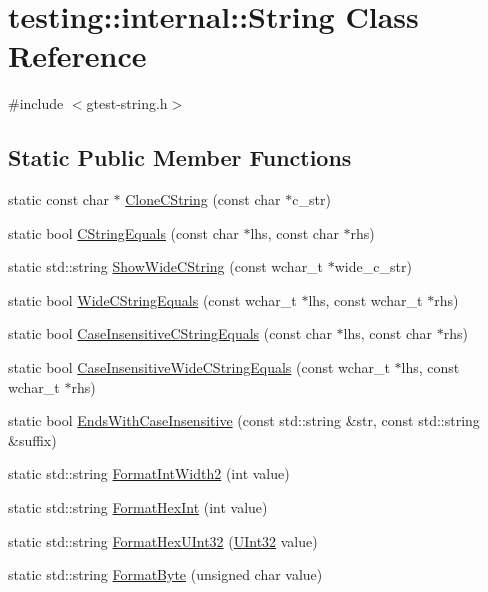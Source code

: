 \hypertarget{classtesting_1_1internal_1_1String}{}\section{testing\+:\+:internal\+:\+:String Class Reference}
\label{classtesting_1_1internal_1_1String}


{\ttfamily \#include $<$gtest-\/string.\+h$>$}

\subsection*{Static Public Member Functions}
\begin{DoxyCompactItemize}
\item 
static const char $\ast$ \hyperlink{classtesting_1_1internal_1_1String_a8bce6b1281ae3d2f9061b920aa78aca0}{Clone\+C\+String} (const char $\ast$c\+\_\+str)
\item 
static bool \hyperlink{classtesting_1_1internal_1_1String_a06919f642bd47f0593196b460d352f24}{C\+String\+Equals} (const char $\ast$lhs, const char $\ast$rhs)
\item 
static std\+::string \hyperlink{classtesting_1_1internal_1_1String_acbf0511e9ae5009f42de77e565f6ba61}{Show\+Wide\+C\+String} (const wchar\+\_\+t $\ast$wide\+\_\+c\+\_\+str)
\item 
static bool \hyperlink{classtesting_1_1internal_1_1String_a4f5e053907ebced07fe0dc52dd2d1e85}{Wide\+C\+String\+Equals} (const wchar\+\_\+t $\ast$lhs, const wchar\+\_\+t $\ast$rhs)
\item 
static bool \hyperlink{classtesting_1_1internal_1_1String_a7ce24c41c67b928fe89434d3571c988c}{Case\+Insensitive\+C\+String\+Equals} (const char $\ast$lhs, const char $\ast$rhs)
\item 
static bool \hyperlink{classtesting_1_1internal_1_1String_a0a67eac434fa7800640c9d56cb91e105}{Case\+Insensitive\+Wide\+C\+String\+Equals} (const wchar\+\_\+t $\ast$lhs, const wchar\+\_\+t $\ast$rhs)
\item 
static bool \hyperlink{classtesting_1_1internal_1_1String_a3de1df085eddc89ef3f3833c67aee3fe}{Ends\+With\+Case\+Insensitive} (const std\+::string \&str, const std\+::string \&suffix)
\item 
static std\+::string \hyperlink{classtesting_1_1internal_1_1String_a51cab855f7ec6091e5886b6be5598ca2}{Format\+Int\+Width2} (int value)
\item 
static std\+::string \hyperlink{classtesting_1_1internal_1_1String_a7bedf4780e0c938d203b73ddb17ff490}{Format\+Hex\+Int} (int value)
\item 
static std\+::string \hyperlink{classtesting_1_1internal_1_1String_a6dda06d6a56456928672287cdec5459b}{Format\+Hex\+U\+Int32} (\hyperlink{namespacetesting_1_1internal_a40d4fffcd2bf56f18b1c380615aa85e3}{U\+Int32} value)
\item 
static std\+::string \hyperlink{classtesting_1_1internal_1_1String_ab3555eeb6abe4b7c6f63d865af10379d}{Format\+Byte} (unsigned char value)
\end{DoxyCompactItemize}

